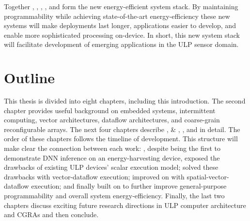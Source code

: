 Together \sonic, \manic, \msilicon, \snafu, and \riptide form the new energy-efficient system stack.
% 
By maintaining programmability while achieving state-of-the-art energy-efficiency these new systems will make deployments last longer, applications easier to develop, and enable more sophisticated processing on-device.
% 
In short, this new system stack will facilitate development of emerging applications in the ULP sensor domain.

\section{Outline}
This thesis is divided into eight chapters, including this introduction.
%
The second chapter provides useful background on embedded systems, intermittent computing, vector architectures, dataflow architectures, and coarse-grain reconfigurable arrays.
% 
The next four chapters describe \sonic, \manic \& \msilicon, \snafu, and \riptide in detail.
% 
The order of these chapters follows the timeline of development.
% 
This structure will make clear the connection between each work:
% 
\sonic, despite being the first to demonstrate DNN inference on an energy-harvesting device, exposed the drawbacks of existing ULP devices' scalar execution model; \manic solved these drawbacks with vector-dataflow execution; \snafu improved on \manic with spatial-vector-dataflow execution; and finally \riptide built on \snafu to further improve general-purpose programmability and overall system energy-efficiency.
% 
Finally, the last two chapters discuss exciting future research directions in ULP computer architecture and CGRAs and then conclude.
